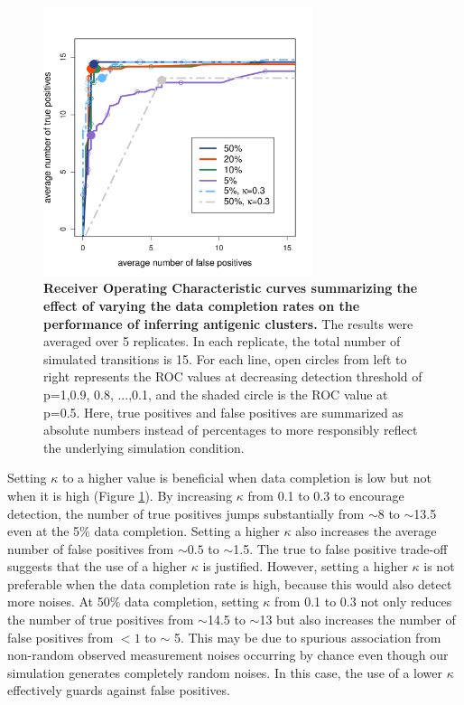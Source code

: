 \documentclass[11pt,oneside,letterpaper]{article}
\begin{document}
\begin{figure}[h]
	\centering		
	\includegraphics[width=0.7\textwidth]{figures/custom/avgTrueVsFalsePositives-completionRate}
	\caption{\textbf{Receiver Operating Characteristic curves summarizing the effect of varying the data completion rates on the performance of inferring antigenic clusters.} 
 The results were averaged over 5 replicates.	
 In each replicate, the total number of simulated transitions is 15.
For each line, open circles from left to right represents the ROC values at decreasing detection threshold of p=1,0.9, 0.8, ...,0.1, and the shaded circle is the ROC value at p=0.5.
Here, true positives and false positives are summarized as absolute numbers instead of percentages to more responsibly reflect the underlying simulation condition.
	 		} 
	
	\label{ROCSimulation} 
\end{figure}






Setting $\kappa$ to a higher value is beneficial when data completion is low but not when it is high (Figure \ref{ROCSimulation}). 
By increasing $\kappa$ from 0.1 to 0.3 to encourage detection, the number of true positives jumps substantially from $\sim8$ to $\sim$13.5 even at the 5\% data completion. 
Setting a higher $\kappa$ also increases the average number of false positives from $\sim0.5$ to $\sim$1.5. 
The true to false positive trade-off suggests that the use of a higher $\kappa$ is justified. 
However, setting a higher $\kappa$ is not preferable when the data completion rate is high, because this would also detect more noises. 
At 50\% data completion, setting $\kappa$ from 0.1 to 0.3 not only reduces the number of true positives from $\sim$14.5 to $\sim$13 but also increases the number of false positives from $<1$ to $\sim$ 5. 
This may be due to  spurious association from non-random observed measurement noises occurring by chance even though our simulation generates completely random noises. 
In this case, the use of a lower $\kappa$ effectively guards against false positives.







\newpage




\end{document}
